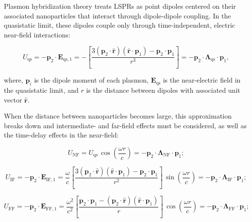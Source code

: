 \documentclass[journal=jpccck,manuscript=article]{achemso}
\begin{document}
Plasmon hybridization theory treats LSPRs as point dipoles centered on their associated nanoparticles that interact through dipole-dipole coupling. In the quasistatic limit, these dipoles couple only through time-independent, electric near-field interactions\cite{jackson_classical_1999}:

\begin{equation}
  U_{\textrm{qs}} = -\textbf{p}_2 \cdot \textbf{E}_{\textrm{qs},1} = -\left[\frac{3(\textbf{p}_2 \cdot \hat{\textbf{r}}) (\hat{\textbf{r}} \cdot \textbf{p}_1) - \textbf{p}_2 \cdot \textbf{p}_1}{r^3}\right] = -\textbf{p}_2 \cdot \boldsymbol{\Lambda}_{\textrm{qs}} \cdot \textbf{p}_1, \label{eqn1}
  \end{equation}

where, $\textbf{p}_i$ is the dipole moment of each plasmon, $\textbf{E}_{\textrm{qs}}$ is the near-electric field in the quasistatic limit, and $r$ is the distance between dipoles with associated unit vector $\hat{\textbf{r}}$.

When the distance between nanoparticles becomes large, this approximation breaks down and intermediate- and far-field effects must be considered, as well as the time-delay effects in the near-field\cite{jackson_classical_1999}:

\begin{equation}
  U_{\textrm{NF}} = U_{\textrm{qs}}\, \cos\left(\frac{\omega r}{c}\right)=-\textbf{p}_2 \cdot \boldsymbol{\Lambda}_{\textrm{NF}} \cdot \textbf{p}_1 ;\label{near}
  \end{equation}

\begin{equation}
  U_{\textrm{IF}} = -\textbf{p}_2 \cdot \textbf{E}_{\textrm{IF},1} = \frac{\omega}{c}\left[\frac{3(\textbf{p}_2 \cdot \hat{\textbf{r}})( \hat{\textbf{r}} \cdot \textbf{p}_1) - \textbf{p}_2 \cdot \textbf{p}_1}{r^2}\right]\,\sin\left(\frac{\omega r}{c}\right)=-\textbf{p}_2 \cdot \boldsymbol{\Lambda}_{\textrm{IF}} \cdot \textbf{p}_1 ; \label{eqn2}
\end{equation}

\begin{equation}
  U_{\textrm{FF}} = -\textbf{p}_2 \cdot \textbf{E}_{\textrm{FF},1} = \frac{\omega^2}{c^2}\left[\frac{\textbf{p}_2 \cdot \textbf{p}_1 -(\textbf{p}_2 \cdot \hat{\textbf{r}}) (\hat{\textbf{r}} \cdot \textbf{p}_1)}{r}\right]\,\cos\left(\frac{\omega r}{c}\right)=-\textbf{p}_2 \cdot \boldsymbol{\Lambda}_{\textrm{FF}} \cdot \textbf{p}_1; \label{eqn3}
\end{equation}
\end{document}
